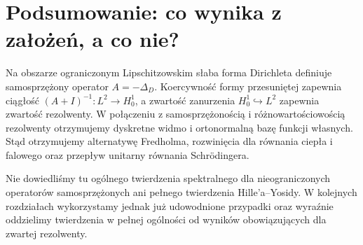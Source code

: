 \section{Podsumowanie: co wynika z założeń, a co nie?}
\label{sec:pde12-summary}

Na obszarze ograniczonym Lipschitzowskim
słaba forma Dirichleta definiuje samosprzężony
operator $A=-\Delta_D$. Koercywność formy przesuniętej zapewnia ciągłość
$(A+I)^{-1}:L^2\to H_0^1$, a zwartość zanurzenia
$H_0^1\hookrightarrow L^2$ zapewnia zwartość rezolwenty.
W połączeniu z samosprzężonością i różnowartościowością
rezolwenty otrzymujemy dyskretne widmo i ortonormalną
bazę funkcji własnych. Stąd otrzymujemy alternatywę
Fredholma, rozwinięcia dla równania ciepła i falowego
oraz przepływ unitarny równania Schrödingera.

Nie dowiedliśmy tu ogólnego twierdzenia spektralnego dla
nieograniczonych operatorów samosprzężonych ani
pełnego twierdzenia Hille'a--Yosidy. W kolejnych rozdziałach
wykorzystamy jednak już udowodnione przypadki oraz
wyraźnie oddzielimy twierdzenia w pełnej ogólności od
wyników obowiązujących dla zwartej rezolwenty.


